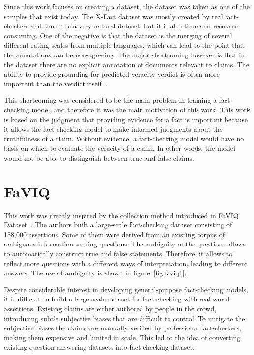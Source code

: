 Since this work focuses on creating a dataset, the dataset was taken as one of the samples that exist today. The X-Fact dataset was mostly created by real fact-checkers and thus it is a very natural dataset, but it is also time and resource consuming. One of the negative is that the dataset is the merging of several different rating scales from multiple languages, which can lead to the point that the annotations can be non-agreeing. The major shortcoming however is that in the dataset there are no explicit annotation of documents relevant to claims. The ability to provide grounding for predicted veracity verdict is often more important than the verdict itself~\cite{lewandovski}.

This shortcoming was considered to be the main problem in training a fact-checking model, and therefore it was the main motivation of this work. This work is based on the judgment that providing evidence for a fact is important because it allows the fact-checking model to make informed judgments about the truthfulness of a claim. Without evidence, a fact-checking model would have no basis on which to evaluate the veracity of a claim. In other words, the model would not be able to distinguish between true and false claims.


\section{FaVIQ}\label{seq:faviq}
This work was greatly inspired by the collection method introduced in FaVIQ Dataset~\cite{faviq}. The authors built a large-scale fact-checking dataset consisting of 188,000 assertions. Some of them were derived from an existing corpus of ambiguous information-seeking questions. The ambiguity of the questions allows to automatically construct true and false statements. Therefore, it allows to reflect more questions with a different ways of interpretation, leading to different answers. The use of ambiguity is shown in figure~\ref{fig:faviq1}.

Despite considerable interest in developing general-purpose fact-checking models, it is difficult to build a large-scale dataset for fact-checking with real-world assertions. Existing claims are either authored by people in the crowd, introducing subtle subjective biases that are difficult to control. To mitigate the subjective biases the claims are manually verified by professional fact-checkers, making them expensive and limited in scale. This led to the idea of converting existing question answering datasets into fact-checking dataset.

